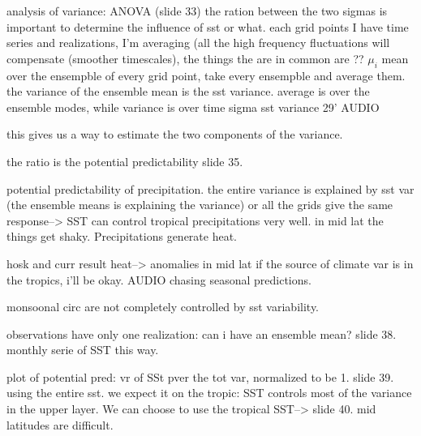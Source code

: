 analysis of variance: ANOVA (slide 33) the ration between the two sigmas is important to determine the influence of sst or what. each grid points I have time series and realizations, I'm averaging (all the high frequency fluctuations will compensate (smoother timescales), the things the are in common are ?? $\mu_i$ mean over the ensempble of every grid point, take every ensempble and average them. the variance of the ensemble mean is the sst variance. average is over the ensemble modes, while variance is over time
sigma sst variance 29' AUDIO

this gives us a way to estimate the two components of the variance.


the ratio is the potential predictability slide 35.

potential predictability of precipitation. the entire variance is explained by sst var (the ensemble means is explaining the variance) or all the grids give the same response--> SST can control tropical precipitations very well. in mid lat the things get shaky. Precipitations generate heat.

hosk and curr result heat--> anomalies in mid lat
if the source of climate var is in the tropics, i'll be okay.
AUDIO
chasing seasonal predictions.

monsoonal circ are not completely controlled by sst variability.



observations have only one realization: can i have an ensemble mean?
slide 38. monthly serie of SST this way.

plot of potential pred: vr of SSt pver the tot var, normalized to be 1. slide 39. using the entire sst. we expect it on the tropic: SST controls most of the variance in the upper layer.
We can choose to use the tropical SST--> slide 40. mid latitudes are difficult.
